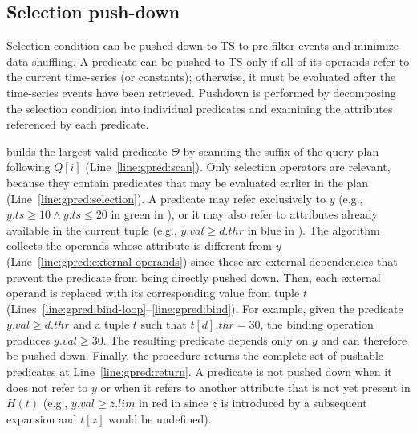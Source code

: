 \subsection{Selection push-down}
\label{subsec:filter-pushdown}

Selection condition can be pushed down to TS to pre-filter events and minimize data shuffling.
A predicate can be pushed to TS only if all of its operands refer to the current time-series (or constants); otherwise, it must be evaluated after the time-series events have been retrieved.
Pushdown is performed by decomposing the selection condition into individual predicates and examining the attributes referenced by each predicate.

 builds the largest valid predicate $\Theta$ by scanning the suffix of the query plan following $Q[i]$ (Line~\ref{line:gpred:scan}).
Only selection operators are relevant, because they contain predicates that may be evaluated earlier in the plan (Line~\ref{line:gpred:selection}).
A predicate may refer exclusively to $y$ (e.g., $y.ts \ge 10 \land y.ts \le 20$ in green in ), or it may also refer to attributes already available in the current tuple (e.g., $y.val \ge d.thr$ in blue in ).
The algorithm collects the operands whose attribute is different from $y$ (Line~\ref{line:gpred:external-operands}) since these are external dependencies that prevent the predicate from being directly pushed down.
Then, each external operand is replaced with its corresponding value from tuple $t$ (Lines~\ref{line:gpred:bind-loop}--\ref{line:gpred:bind}).
For example, given the predicate $y.val \ge d.thr$  and a tuple $t$ such that $t[d].thr = 30$, the binding operation produces $y.val \ge 30$.
The resulting predicate depends only on $y$ and can therefore be pushed down.
Finally, the procedure returns the complete set of pushable predicates at Line~\ref{line:gpred:return}.
A predicate is not pushed down when it does not refer to $y$ or when it refers to another attribute that is not yet present in $H(t)$ (e.g., $y.val \ge z.lim$ in red in  since $z$ is introduced by a subsequent expansion and $t[z]$ would be undefined). 

